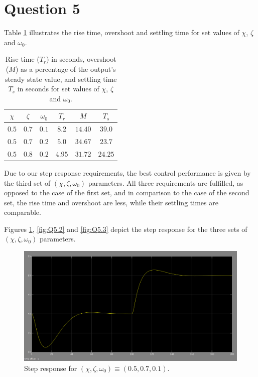 \section{Question 5}

Table \ref{tbl:Q5} illustrates the rise time, overshoot and settling time for
set values of $\chi$, $\zeta$ and $\omega_0$.

\begin{table}[H]\centering
  \begin{tabular}{ccc|ccc}
  $\chi$  & $\zeta$  & $\omega_0$  & $T_r$  & $M$      & $T_s$   \\ \hline
  $0.5$   & $0.7$    & $0.1$       & $8.2$  & $14.40$   & $39.0$    \\ \hline
  $0.5$   & $0.7$    & $0.2$       & $5.0$  & $34.67$  & $23.7$  \\ \hline
  $0.5$   & $0.8$    & $0.2$       & $4.95$ & $31.72$  & $24.25$ \\ \hline
  \end{tabular}
  \caption{Rise time ($T_r$) in seconds, overshoot ($M$) as a percentage of the
    output's steady state value, and settling time $T_s$ in seconds for set
    values of $\chi$, $\zeta$ and $\omega_0$.}
  \label{tbl:Q5}
\end{table}


Due to our step response requirements, the best control performance is given by
the third set of $(\chi, \zeta, \omega_0)$ parameters. All three requirements
are fulfilled, as opposed to the case of the first set, and in comparison to the
case of the second set, the rise time and overshoot are less, while their
settling times are comparable.

Figures \ref{fig:Q5.1}, \ref{fig:Q5.2} and \ref{fig:Q5.3} depict the step
response for the three sets of $(\chi, \zeta, \omega_0)$ parameters.

\begin{figure}[H]\centering
  \includegraphics[scale=0.3]{./images/5/tank_2_setting_1.png}
  \caption{Step response for $(\chi, \zeta, \omega_0) \equiv (0.5, 0.7, 0.1)$.}
  \label{fig:Q5.1}
\end{figure}

